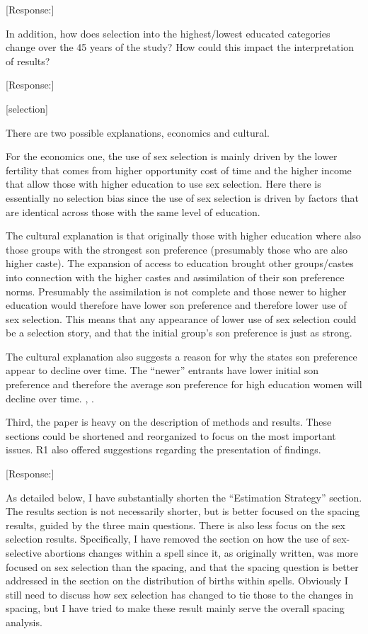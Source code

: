 \documentclass[letterpaper,12pt]{article}
\begin{document}
[Response:]



In addition, how does
selection into the highest/lowest educated categories change over the 45
years of the study? How could this impact the interpretation of results?

[Response:]

[selection]

There are two possible explanations, economics and cultural.

For the economics one, the use of sex selection is mainly driven by the lower fertility
that comes from higher opportunity cost of time and the higher income that allow those
with higher education to use sex selection.
Here there is essentially no selection bias since the use of sex selection is driven
by factors that are identical across those with the same level of education.

The cultural explanation is that originally those with higher education where also those
groups with the strongest son preference (presumably those who are also higher caste).
The expansion of access to education brought other groups/castes into connection with
the higher castes and assimilation of their son preference norms.
Presumably the assimilation is not complete and those newer to higher education would
therefore have lower son preference and therefore lower use of sex selection.
This means that any appearance of lower use of sex selection could be a selection story,
and that the initial group's son preference is just as strong.

The cultural explanation also suggests a reason for why the states son preference 
appear to decline over time.
The ``newer'' entrants have lower initial son preference and therefore the average
son preference for high education women will decline over time.
\citep{bhat03}, \citep{pande07}.



Third, the paper is heavy on the description of methods and results.
These sections could be shortened and reorganized to focus on the most
important issues. R1 also offered suggestions regarding the presentation
of findings.

[Response:]

As detailed below, I have substantially shorten the ``Estimation Strategy'' section.
The results section is not necessarily shorter, but is better focused on the spacing
results, guided by the three main questions.
There is also less focus on the sex selection results.
Specifically, I have removed the section on how the use of sex-selective abortions changes 
within a spell since it, as originally written, was more focused on sex selection than
the spacing, and that the spacing question is better addressed in the section on the
distribution of births within spells.
Obviously I still need to discuss how sex selection has changed to tie those to the 
changes in spacing, but I have tried to make these result mainly serve the overall
spacing analysis.
\end{document}
